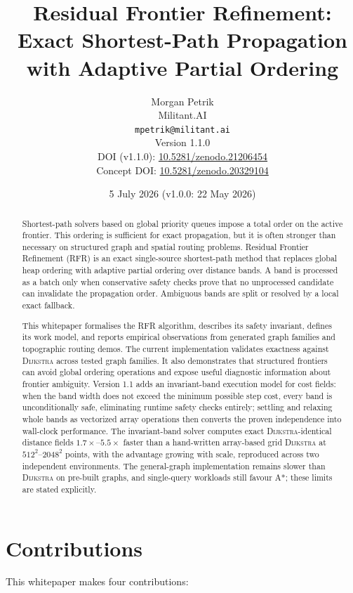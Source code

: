 \documentclass[11pt]{article}
\title{Residual Frontier Refinement: Exact Shortest-Path Propagation with Adaptive Partial Ordering}
\author{
  Morgan Petrik\\
  Militant.AI\\
  \texttt{mpetrik@militant.ai}\\[0.75em]
  Version 1.1.0\\[0.25em]
  DOI (v1.1.0): \href{https://doi.org/10.5281/zenodo.21206454}{10.5281/zenodo.21206454}\\
  Concept DOI: \href{https://doi.org/10.5281/zenodo.20329104}{10.5281/zenodo.20329104}
}
\date{5 July 2026 \quad (v1.0.0: 22 May 2026)}
\newcommand{\RFR}{\textsc{RFR}}
\newcommand{\Dijkstra}{\textsc{Dijkstra}}
\begin{document}
\maketitle

\begin{abstract}
Shortest-path solvers based on global priority queues impose a total order on the active frontier. This ordering is sufficient for exact propagation, but it is often stronger than necessary on structured graph and spatial routing problems. Residual Frontier Refinement (\RFR{}) is an exact single-source shortest-path method that replaces global heap ordering with adaptive partial ordering over distance bands. A band is processed as a batch only when conservative safety checks prove that no unprocessed candidate can invalidate the propagation order. Ambiguous bands are split or resolved by a local exact fallback.

This whitepaper formalises the \RFR{} algorithm, describes its safety invariant, defines its work model, and reports empirical observations from generated graph families and topographic routing demos. The current implementation validates exactness against \Dijkstra{} across tested graph families. It also demonstrates that structured frontiers can avoid global ordering operations and expose useful diagnostic information about frontier ambiguity. Version 1.1 adds an invariant-band execution model for cost fields: when the band width does not exceed the minimum possible step cost, every band is unconditionally safe, eliminating runtime safety checks entirely; settling and relaxing whole bands as vectorized array operations then converts the proven independence into wall-clock performance. The invariant-band solver computes exact \Dijkstra{}-identical distance fields $1.7\times$--$5.5\times$ faster than a hand-written array-based grid \Dijkstra{} at $512^2$--$2048^2$ points, with the advantage growing with scale, reproduced across two independent environments. The general-graph implementation remains slower than \Dijkstra{} on pre-built graphs, and single-query workloads still favour A*; these limits are stated explicitly.
\end{abstract}

\section{Contributions}

This whitepaper makes four contributions:
\end{document}
